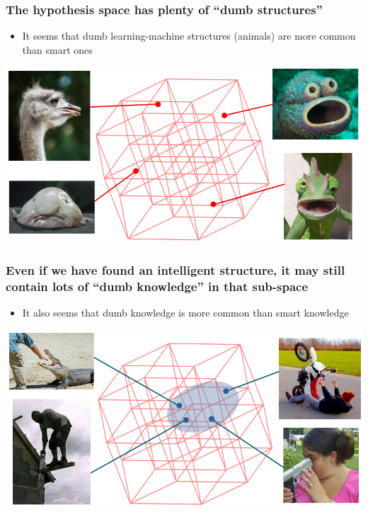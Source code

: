 \documentclass[16pt]{beamer}
\begin{document}
\begin{frame}
\frametitle{The hypothesis space has plenty of ``dumb structures''}
\begin{itemize}
	\item It seems that dumb learning-machine structures (animals) are more common than smart ones
\end{itemize}

\centering
\includegraphics[scale=0.35]{dumb.png}
\end{frame}

\begin{frame}
	\frametitle{Even if we have found an intelligent structure, it may still contain lots of ``dumb knowledge'' in that sub-space}
\begin{itemize}
	\item It also seems that dumb knowledge is more common than smart knowledge
\end{itemize}

\centering
\includegraphics[scale=0.35]{dumb-behavior.png}
\end{frame}
\end{document}
